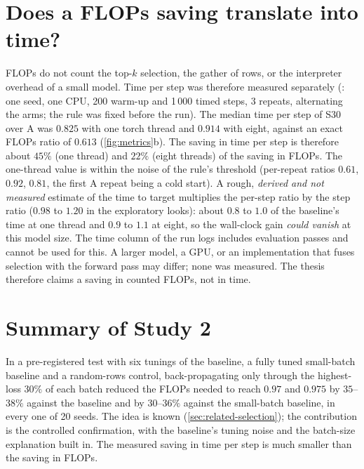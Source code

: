 \section{Does a FLOPs saving translate into time?}\label{sec:wallclock}
FLOPs do not count the top-$k$ selection, the gather of rows, or the interpreter overhead of a small model. Time per step was therefore measured separately (\tierE{}: one seed, one CPU, 200 warm-up and 1\,000 timed steps, 3 repeats, alternating the arms; the rule was fixed before the run). The median time per step of S30 over A was $0.825$ with one torch thread and $0.914$ with eight, against an exact FLOPs ratio of $0.613$ (\cref{fig:metrics}b). The saving in time per step is therefore about $45\%$ (one thread) and $22\%$ (eight threads) of the saving in FLOPs. The one-thread value is within the noise of the rule's threshold (per-repeat ratios $0.61$, $0.92$, $0.81$, the first A repeat being a cold start). A rough, \emph{derived and not measured} estimate of the time to target multiplies the per-step ratio by the step ratio ($0.98$ to $1.20$ in the exploratory looks): about $0.8$ to $1.0$ of the baseline's time at one thread and $0.9$ to $1.1$ at eight, so the wall-clock gain \emph{could vanish} at this model size. The time column of the run logs includes evaluation passes and cannot be used for this. A larger model, a GPU, or an implementation that fuses selection with the forward pass may differ; none was measured. The thesis therefore claims a saving in counted FLOPs, not in time.

\section{Summary of Study 2}
In a pre-registered test with six tunings of the baseline, a fully tuned small-batch baseline and a random-rows control, back-propagating only through the highest-loss $30\%$ of each batch reduced the FLOPs needed to reach $0.97$ and $0.975$ by $35$--$38\%$ against the baseline and by $30$--$36\%$ against the small-batch baseline, in every one of 20 seeds. The idea is known (\cref{sec:related-selection}); the contribution is the controlled confirmation, with the baseline's tuning noise and the batch-size explanation built in. The measured saving in time per step is much smaller than the saving in FLOPs.
